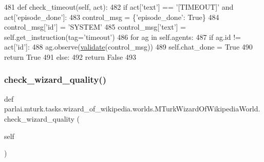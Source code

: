 \begin{DoxyCode}
481     \textcolor{keyword}{def }check\_timeout(self, act):
482         \textcolor{keywordflow}{if} act[\textcolor{stringliteral}{'text'}] == \textcolor{stringliteral}{'[TIMEOUT]'} \textcolor{keywordflow}{and} act[\textcolor{stringliteral}{'episode\_done'}]:
483             control\_msg = \{\textcolor{stringliteral}{'episode\_done'}: \textcolor{keyword}{True}\}
484             control\_msg[\textcolor{stringliteral}{'id'}] = \textcolor{stringliteral}{'SYSTEM'}
485             control\_msg[\textcolor{stringliteral}{'text'}] = self.get\_instruction(tag=\textcolor{stringliteral}{'timeout'})
486             \textcolor{keywordflow}{for} ag \textcolor{keywordflow}{in} self.agents:
487                 \textcolor{keywordflow}{if} ag.id != act[\textcolor{stringliteral}{'id'}]:
488                     ag.observe(\hyperlink{namespaceparlai_1_1core_1_1worlds_afc3fad603b7bce41dbdc9cdc04a9c794}{validate}(control\_msg))
489             self.chat\_done = \textcolor{keyword}{True}
490             \textcolor{keywordflow}{return} \textcolor{keyword}{True}
491         \textcolor{keywordflow}{else}:
492             \textcolor{keywordflow}{return} \textcolor{keyword}{False}
493 
\end{DoxyCode}
\mbox{\label{classparlai_1_1mturk_1_1tasks_1_1wizard__of__wikipedia_1_1worlds_1_1MTurkWizardOfWikipediaWorld_a7667ae6daa0c1befc1c4f815f0daccfd}} 
\subsubsection{\texorpdfstring{check\+\_\+wizard\+\_\+quality()}{check\_wizard\_quality()}}
{\footnotesize\ttfamily def parlai.\+mturk.\+tasks.\+wizard\+\_\+of\+\_\+wikipedia.\+worlds.\+M\+Turk\+Wizard\+Of\+Wikipedia\+World.\+check\+\_\+wizard\+\_\+quality (\begin{DoxyParamCaption}\item[{}]{self }\end{DoxyParamCaption})}

